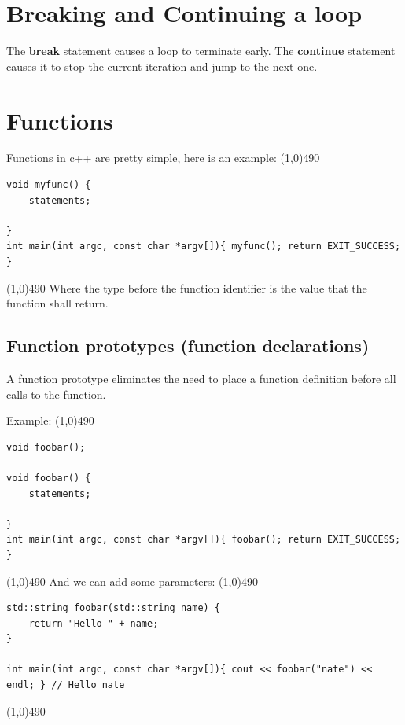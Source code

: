 \documentclass{report}
\begin{document}
    \pagebreak \bigbreak \noindent 
    \section{\LARGE Breaking and Continuing a loop}
    \bigbreak \noindent 
    \begin{concept}
 The \textbf{break} statement causes a loop to terminate early. The \textbf{continue} statement causes it to stop the current iteration and jump to the next one.
	\end{concept}

    \pagebreak \bigbreak \noindent 
    \section{\LARGE Functions}
    \bigbreak \noindent 
    Functions in c++ are pretty simple, here is an example:
    \bigbreak \noindent 
    \line(1,0){490}
    \begin{verbatim}
void myfunc() {
    statements;

}
int main(int argc, const char *argv[]){ myfunc(); return EXIT_SUCCESS; }
    \end{verbatim}
    \line(1,0){490}
    \bigbreak \noindent 
    Where the type before the function identifier is the value that the function shall return.
    \bigbreak \noindent 
    \subsection{Function prototypes (function declarations)}
    \bigbreak \noindent 
    \begin{concept}
 A function prototype eliminates the need to place a function definition before all calls to the function.
	\end{concept}
    \bigbreak \noindent 
    Example:
    \bigbreak \noindent 
    \line(1,0){490}
    \begin{verbatim}
void foobar();

void foobar() {
    statements;

}
int main(int argc, const char *argv[]){ foobar(); return EXIT_SUCCESS; }
    \end{verbatim}
    \line(1,0){490}
    \bigbreak \noindent 
    \bigbreak \noindent 
    And we can add some parameters:
    \bigbreak \noindent 
    \line(1,0){490}
    \begin{verbatim}
std::string foobar(std::string name) {
    return "Hello " + name;
}  

int main(int argc, const char *argv[]){ cout << foobar("nate") << endl; } // Hello nate 
    \end{verbatim}
    \line(1,0){490}
\end{document}
